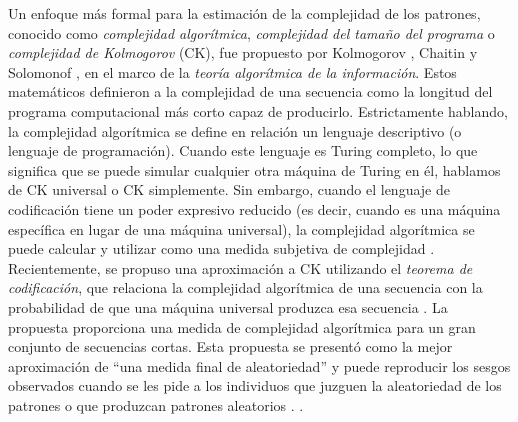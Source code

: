Un enfoque más formal para la estimación de la complejidad de los patrones, conocido como \textit{complejidad algorítmica}, \textit{complejidad del tamaño del programa} o \textit{complejidad de Kolmogorov} (CK), fue propuesto por Kolmogorov \cite{kolmogorov1965three}, Chaitin \cite{f40} y Solomonof \cite{solomonoff1964formal}, en el marco de la \textit{teoría algorítmica de la información}. Estos matemáticos definieron a la complejidad de una secuencia como la longitud del programa computacional más corto capaz de producirlo. Estrictamente hablando, la complejidad algorítmica se define en relación un lenguaje descriptivo (o lenguaje de programación). Cuando este lenguaje es Turing completo, lo que significa que se puede simular cualquier otra máquina de Turing en él, hablamos de CK universal o CK simplemente. Sin embargo, cuando el lenguaje de codificación tiene un poder expresivo reducido (es decir, cuando es una máquina específica en lugar de una máquina universal), la complejidad algorítmica se puede calcular y utilizar como una medida subjetiva de complejidad \cite{romano2013language}. Recientemente, se propuso una aproximación a CK utilizando el \textit{teorema de codificación}, que relaciona la complejidad algorítmica de una secuencia con la probabilidad de que una máquina universal produzca esa secuencia \cite{f43,f44,f45,f46}. La propuesta proporciona una medida de complejidad algorítmica para un gran conjunto de secuencias cortas. Esta propuesta se presentó como la mejor aproximación de “una medida final de aleatoriedad” y puede reproducir los sesgos observados cuando se les pide a los individuos que juzguen la aleatoriedad de los patrones o que produzcan patrones aleatorios \cite{f44,f45}. .


